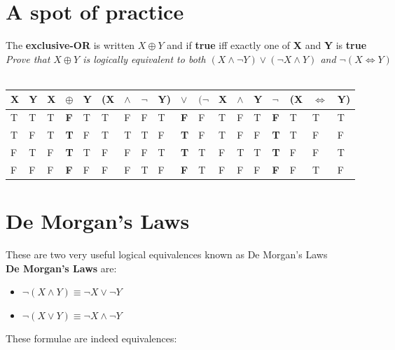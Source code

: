 \documentclass{article}[18pt]
\begin{document}
\section{A spot of practice}
The \textbf{exclusive-OR} is written $X\oplus Y$ and if \textbf{true} iff exactly one of \textbf{X} and \textbf{Y} is \textbf{true}\\
\textit{Prove that $X\oplus Y$ is logically equivalent to both $(X\land\lnot Y)\lor(\lnot X\land Y)$ and $\lnot(X\Leftrightarrow Y)$}\\
\\
\begin{tabular}{|l|l|lll|lllllllll|llll}
\cline{1-2}
X & Y & X & $\oplus$   & Y & (X & $\land$ & $\lnot$ & Y) & $\lor$     & $(\lnot$ & X & $\land$ & Y & $\lnot$    & (X & $\Leftrightarrow$ & Y) \\ \hline
T & T & T & \textbf{F} & T & T  & F       & F       & T  & \textbf{F} & F        & T & F       & T & \textbf{F} & T  & T                 & T  \\ \cline{1-2}
T & F & T & \textbf{T} & F & T  & T       & T       & F  & \textbf{T} & F        & T & F       & F & \textbf{T} & T  & F                 & F  \\ \cline{1-2}
F & T & F & \textbf{T} & T & F  & F       & F       & T  & \textbf{T} & T        & F & T       & T & \textbf{T} & F  & F                 & T  \\ \cline{1-2}
F & F & F & \textbf{F} & F & F  & F       & T       & F  & \textbf{F} & T        & F & F       & F & \textbf{F} & F  & T                 & F  \\ \cline{1-2}
\end{tabular}
\section{De Morgan's Laws}
These are two very useful logical equivalences known as De Morgan's Laws\\
\textbf{De Morgan's Laws} are:
\begin{itemize}
\item $\lnot(X\land Y)\equiv \lnot X\lor\lnot Y$
\item $\lnot(X\lor Y)\equiv \lnot X\land\lnot Y$
\end{itemize}
These formulae are indeed equivalences:\\
\\
\end{document}
